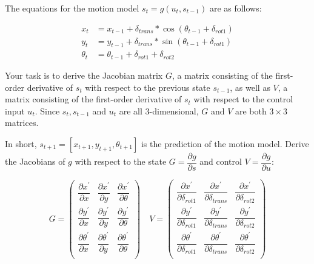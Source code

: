 \documentclass{article}
\begin{document}
The equations for the motion model $s_{t}=g(u_{t},s_{t-1})$ are as follows:

\begin{align*}
    x_{t} &= x_{t-1}+\delta_{trans}*\cos(\theta_{t-1}+\delta_{rot1}) \\
    y_{t} &= y_{t-1}+\delta_{trans}*\sin(\theta_{t-1}+\delta_{rot1}) \\
    \theta_{t} &= \theta_{t-1}+\delta_{rot1}+\delta_{rot2}
\end{align*}

Your task is to derive the Jacobian matrix $G$, a matrix consisting of the first-order derivative of $s_{t}$ with respect to the previous state $s_{t-1}$, as well as $V$, a matrix consisting of the first-order derivative of $s_{t}$ with respect to the control input $u_{t}$. Since $s_{t},s_{t-1}$ and $u_{t}$ are all 3-dimensional, $G$ and $V$ are both $3\times 3$ matrices.

In short, $s_{t+1}=[x_{t+1},y_{t+1},\theta_{t+1}]$ is the prediction of the motion model. Derive the Jacobians of $g$ with respect to the state $G=\dfrac{\partial g}{\partial s}$ and control $V=\dfrac{\partial g}{\partial u}$:

\[
G=\begin{pmatrix}
\dfrac{\partial x^{\prime}}{\partial x} & \dfrac{\partial x^{\prime}}{\partial y} & \dfrac{\partial x^{\prime}}{\partial \theta} \\
\dfrac{\partial y^{\prime}}{\partial x} & \dfrac{\partial y^{\prime}}{\partial y} & \dfrac{\partial y^{\prime}}{\partial \theta} \\
\dfrac{\partial \theta^{\prime}}{\partial x} & \dfrac{\partial \theta^{\prime}}{\partial y} & \dfrac{\partial \theta^{\prime}}{\partial \theta} \\
\end{pmatrix}
\quad
V=\begin{pmatrix}
\dfrac{\partial x^{\prime}}{\partial \delta_{rot1}} & \dfrac{\partial x^{\prime}}{\partial \delta_{trans}} & \dfrac{\partial x^{\prime}}{\partial \delta_{rot2}} \\
\dfrac{\partial y^{\prime}}{\partial \delta_{rot1}} & \dfrac{\partial y^{\prime}}{\partial \delta_{trans}} & \dfrac{\partial y^{\prime}}{\partial \delta_{rot2}} \\
\dfrac{\partial \theta^{\prime}}{\partial \delta_{rot1}} & \dfrac{\partial \theta^{\prime}}{\partial \delta_{trans}} & \dfrac{\partial \theta^{\prime}}{\partial \delta_{rot2}} \\
\end{pmatrix}
\]
\end{document}
